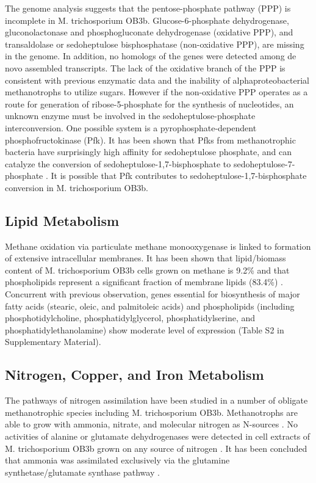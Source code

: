 The genome analysis suggests that the pentose-phosphate pathway (PPP) is incomplete in M. trichosporium OB3b.
Glucose-6-phosphate dehydrogenase, gluconolactonase and phosphogluconate dehydrogenase (oxidative PPP), and transaldolase or sedoheptulose bisphosphatase (non-oxidative PPP), are missing in the genome.
In addition, no homologs of the genes were detected among de novo assembled transcripts.
The lack of the oxidative branch of the PPP is consistent with previous enzymatic data and the inability of alphaproteobacterial methanotrophs to utilize sugars.
However if the non-oxidative PPP operates as a route for generation of ribose-5-phosphate for the synthesis of nucleotides, an unknown enzyme must be involved in the sedoheptulose-phosphate interconversion.
One possible system is a pyrophosphate-dependent phosphofructokinase (Pfk).
It has been shown that Pfks from methanotrophic bacteria have surprisingly high affinity for sedoheptulose phosphate, and can catalyze the conversion of sedoheptulose-1,7-bisphosphate to sedoheptulose-7-phosphate \cite{reshetnikov2008, rozova2012}.
It is possible that Pfk contributes to sedoheptulose-1,7-bisphosphate conversion in M. trichosporium OB3b.

\subsection{Lipid Metabolism}
Methane oxidation via particulate methane monooxygenase is linked to formation of extensive intracellular membranes.
It has been shown that lipid/biomass content of M. trichosporium OB3b cells grown on methane is 9.2\% and that phospholipids represent a significant fraction of membrane lipids (83.4\%) \cite{weaver1975, guckert1991}.
Concurrent with previous observation, genes essential for biosynthesis of major fatty acids (stearic, oleic, and palmitoleic acids) and phospholipids (including phosphotidylcholine, phosphatidylglycerol, phosphatidylserine, and phosphatidylethanolamine) show moderate level of expression (Table S2 in Supplementary Material).

\subsection{Nitrogen, Copper, and Iron Metabolism}
The pathways of nitrogen assimilation have been studied in a number of obligate methanotrophic species including M. trichosporium OB3b.
Methanotrophs are able to grow with ammonia, nitrate, and molecular nitrogen as N-sources \cite{whittenbury1970, shishkina1979, murrell1983a, murrell1983b, chu1998, kim2001}.
No activities of alanine or glutamate dehydrogenases were detected in cell extracts of M. trichosporium OB3b grown on any source of nitrogen \cite{shishkina1979, murrell1983a, murrell1983b}.
It has been concluded that ammonia was assimilated exclusively via the glutamine synthetase/glutamate synthase pathway \cite{murrell1983b}.

